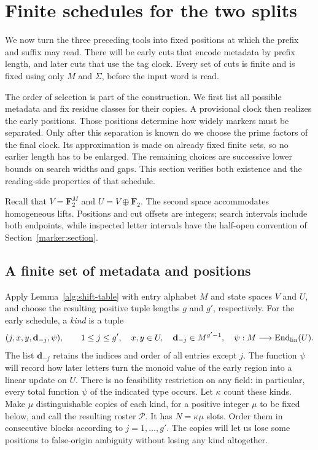 \section{Finite schedules for the two splits}\label{schedule:section}

We now turn the three preceding tools into fixed positions at which the
prefix and suffix may read. There will be early cuts that encode metadata
by prefix length, and later cuts that use the tag clock. Every set of cuts
is finite and is fixed using only $M$ and $\Sigma$, before the input word
is read.

The order of selection is part of the construction. We first list all
possible metadata and fix residue classes for their copies. A provisional
clock then realizes the early positions. Those positions determine how
widely markers must be separated. Only after this separation is known do
we choose the prime factors of the final clock. Its approximation is made
on already fixed finite sets, so no earlier length has to be enlarged.
The remaining choices are successive lower bounds on search widths and
gaps. This section verifies both existence and the reading-side properties
of that schedule.

Recall that $V=\mathbf F_2^M$ and $U=V\oplus\mathbf F_2$. The second
space accommodates homogeneous lifts. Positions and cut offsets are
integers; search intervals include both endpoints, while inspected letter
intervals have the half-open convention of Section~\ref{marker:section}.

\subsection{A finite set of metadata and positions}\label{schedule:choices}

Apply Lemma~\ref{alg:shift-table} with entry alphabet $M$ and state spaces
$V$ and $U$, and choose the resulting positive tuple lengths $g$ and $g'$,
respectively.  For the early schedule, a \emph{kind} is a tuple
\begin{equation}\label{schedule:kinds}
 (j,x,y,\mathbf d_{-j},\psi),\qquad
 1\le j\le g',\quad x,y\in U,\quad
 \mathbf d_{-j}\in M^{g'-1},\quad
 \psi:M\longrightarrow\operatorname{End}_{\rm lin}(U).
\end{equation}
The list $\mathbf d_{-j}$ retains the indices and order of all entries
except $j$. The function $\psi$ will record how later letters turn the
monoid value of the early region into a linear update on $U$. There is no
feasibility restriction on any field: in particular, every total function
$\psi$ of the indicated type occurs.
Let $\kappa$ count these kinds. Make $\mu$ distinguishable copies of each
kind, for a positive integer $\mu$ to be fixed below, and call the resulting
roster $\mathcal P$. It has $N=\kappa\mu$ slots. Order them in consecutive
blocks according to $j=1,\ldots,g'$. The copies will let us lose some
positions to false-origin ambiguity without losing any kind altogether.

